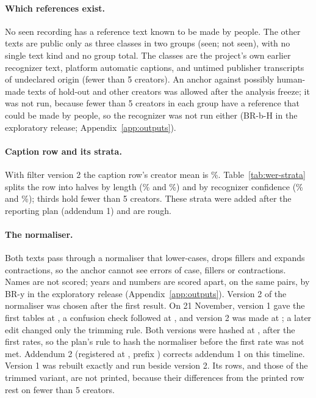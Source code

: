 \paragraph{Which references exist.} No seen recording has a reference text known to be made by people. The other texts
are public only as three classes in two groups (seen; not seen), with no single text kind and no group total. The
classes are the project's own earlier recognizer text, platform automatic captions, and untimed publisher transcripts of
undeclared origin (fewer than 5 creators). An anchor against possibly human-made texts of hold-out and other creators was allowed
after the analysis freeze; it was not run, because fewer than 5 creators in each group have a reference that could be
made by people, so the recognizer was not run either (BR-b-H in the exploratory release; Appendix~\ref{app:outputs}).

\paragraph{Caption row and its strata.} With filter version 2 the caption row's creator mean is
\AnchorCaptionFilteredPct\%. Table~\ref{tab:wer-strata} splits the row into halves by length (\AnchorCaptionShortPct\%
and \AnchorCaptionLongPct\%) and by recognizer confidence (\AnchorCaptionLowConfPct\% and \AnchorCaptionHighConfPct\%);
thirds hold fewer than 5 creators. These strata were added after the reporting plan (addendum 1) and are rough.

\paragraph{The normaliser.} Both texts pass through a normaliser that lower-cases, drops fillers and expands
contractions, so the anchor cannot see errors of case, fillers or contractions. Names are not scored; years and numbers
are scored apart, on the same pairs, by BR-y in the exploratory release (Appendix~\ref{app:outputs}). Version 2 of the
normaliser was chosen after the first result.
On 21 November, version 1 gave the first tables at \AnchorFirstTablesStamp, a confusion check followed at
\AnchorConfusionStamp, and version 2 was made at \AnchorNormaliserFixedStamp; a later edit changed only the trimming
rule. Both versions were hashed at \AnchorHashStamp, after the first rates, so the plan's rule to hash the normaliser
before the first rate was not met. Addendum 2 (registered at \AddendumTwoStamp, prefix \AddendumTwoShaPrefix) corrects
addendum 1 on this timeline. Version 1 was rebuilt exactly and run beside version 2. Its rows, and those of the trimmed
variant, are not printed, because their differences from the printed row rest on fewer than 5 creators.

